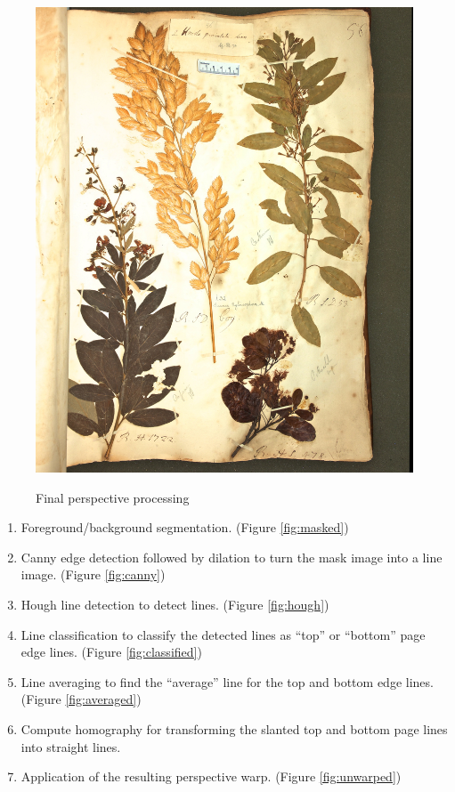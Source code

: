 \documentclass[a4paper]{llncs}
\begin{document}
\begin{figure}[htbm]
{  \includegraphics[height=.35\textheight]{figures/Catesby_HS232_056_0602-unwarped-stretch.jpg}
  \label{fig:unwarped}
  }
  \caption{Final perspective processing}\label{fig:final}
\end{figure}

\begin{figure}[htbm]
  
\end{figure}

\begin{enumerate}
  \item Foreground/background segmentation. (Figure \ref{fig:masked})
  \item Canny edge detection followed by dilation to turn the mask image into a line image. (Figure \ref{fig:canny})
  \item Hough line detection to detect lines. (Figure \ref{fig:hough})
  \item Line classification to classify the detected lines as “top” or “bottom” page edge lines. (Figure \ref{fig:classified})
  \item Line averaging to find the “average” line for the top and bottom edge lines. (Figure \ref{fig:averaged})
  \item Compute homography for transforming the slanted top and bottom page lines into straight lines.
  \item Application of the resulting perspective warp. (Figure \ref{fig:unwarped})
\end{enumerate}
\end{document}
